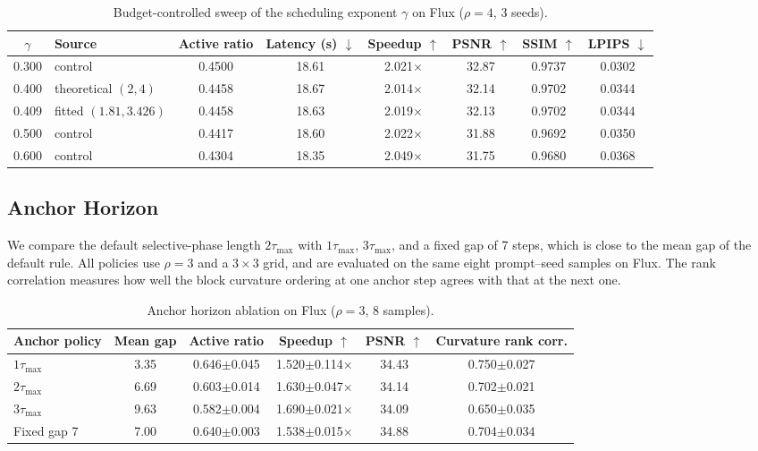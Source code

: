 \begin{table}[h]
\centering
\caption{Budget-controlled sweep of the scheduling exponent $\gamma$ on Flux ($\rho=4$, 3 seeds).}
\label{tab:gamma}
\small
\setlength{\tabcolsep}{4pt}
\begin{tabular}{clcccccc}
\toprule
$\gamma$ & Source & Active ratio & Latency (s) $\downarrow$ & Speedup $\uparrow$ & PSNR $\uparrow$ & SSIM $\uparrow$ & LPIPS $\downarrow$ \\
\midrule
0.300 & control & 0.4500 & 18.61 & 2.021$\times$ & 32.87 & 0.9737 & 0.0302 \\
\rowcolor{lightbluerow}
0.400 & theoretical $(2,4)$ & 0.4458 & 18.67 & 2.014$\times$ & 32.14 & 0.9702 & 0.0344 \\
0.409 & fitted $(1.81,3.426)$ & 0.4458 & 18.63 & 2.019$\times$ & 32.13 & 0.9702 & 0.0344 \\
0.500 & control & 0.4417 & 18.60 & 2.022$\times$ & 31.88 & 0.9692 & 0.0350 \\
0.600 & control & 0.4304 & 18.35 & 2.049$\times$ & 31.75 & 0.9680 & 0.0368 \\
\bottomrule
\end{tabular}
\end{table}

\subsection{Anchor Horizon}
\label{app:anchor_ablation}
We compare the default selective-phase length $2\tau_{\max}$ with $1\tau_{\max}$, $3\tau_{\max}$, and a fixed gap of 7 steps, which is close to the mean gap of the default rule. All policies use $\rho=3$ and a $3\times3$ grid, and are evaluated on the same eight prompt--seed samples on Flux. The rank correlation measures how well the block curvature ordering at one anchor step agrees with that at the next one.

\begin{table}[h]
\centering
\caption{Anchor horizon ablation on Flux ($\rho=3$, 8 samples).}
\label{tab:anchor}
\small
\begin{tabular}{lccccc}
\toprule
Anchor policy & Mean gap & Active ratio & Speedup $\uparrow$ & PSNR $\uparrow$ & Curvature rank corr. \\
\midrule
$1\tau_{\max}$ & 3.35 & 0.646$\pm$0.045 & 1.520$\pm$0.114$\times$ & 34.43 & 0.750$\pm$0.027 \\
\rowcolor{lightbluerow}
$2\tau_{\max}$ & 6.69 & 0.603$\pm$0.014 & 1.630$\pm$0.047$\times$ & 34.14 & 0.702$\pm$0.021 \\
$3\tau_{\max}$ & 9.63 & 0.582$\pm$0.004 & 1.690$\pm$0.021$\times$ & 34.09 & 0.650$\pm$0.035 \\
Fixed gap 7 & 7.00 & 0.640$\pm$0.003 & 1.538$\pm$0.015$\times$ & 34.88 & 0.704$\pm$0.034 \\
\bottomrule
\end{tabular}
\end{table}


